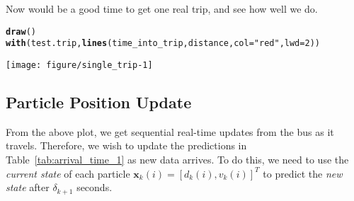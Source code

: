 \documentclass[11pt]{article}\usepackage[]{graphicx}\usepackage[]{color}
\makeatletter
\def\maxwidth{ %
  \ifdim\Gin@nat@width>\linewidth
    \linewidth
  \else
    \Gin@nat@width
  \fi
}
\newcommand{\hlnum}[1]{\textcolor[rgb]{0.686,0.059,0.569}{#1}}%
\newcommand{\hlstr}[1]{\textcolor[rgb]{0.192,0.494,0.8}{#1}}%
\newcommand{\hlstd}[1]{\textcolor[rgb]{0.345,0.345,0.345}{#1}}%
\newcommand{\hlkwc}[1]{\textcolor[rgb]{0.333,0.667,0.333}{#1}}%
\newcommand{\hlkwd}[1]{\textcolor[rgb]{0.737,0.353,0.396}{\textbf{#1}}}%
\newenvironment{kframe}{%
 \def\at@end@of@kframe{}%
 \ifinner\ifhmode%
  \def\at@end@of@kframe{\end{minipage}}%
  \begin{minipage}{\columnwidth}%
 \fi\fi%
 \def\FrameCommand##1{\hskip\@totalleftmargin \hskip-\fboxsep
 \colorbox{shadecolor}{##1}\hskip-\fboxsep
     \hskip-\linewidth \hskip-\@totalleftmargin \hskip\columnwidth}%
 \MakeFramed {\advance\hsize-\width
   \@totalleftmargin\z@ \linewidth\hsize
   \@setminipage}}%
 {\par\unskip\endMakeFramed%
 \at@end@of@kframe}
\newenvironment{knitrout}{}{} %
\newcommand{\bx}{\boldsymbol{x}}
\makeatother
\begin{document}
Now would be a good time to get one real trip, and see how well we do.
\begin{knitrout}
\color{fgcolor}\begin{kframe}
\begin{alltt}
\hlkwd{draw}\hlstd{()}
\hlkwd{with}\hlstd{(test.trip,} \hlkwd{lines}\hlstd{(time_into_trip, distance,} \hlkwc{col} \hlstd{=} \hlstr{"red"}\hlstd{,} \hlkwc{lwd} \hlstd{=} \hlnum{2}\hlstd{))}
\end{alltt}
\end{kframe}
\texttt{[image: figure/single\_trip-1]} 

\end{knitrout}


\subsection{Particle Position Update}
\label{sec:particle_likelihood}

From the above plot, we get sequential real-time updates from the bus as it travels.
Therefore, we wish to update the predictions in Table~\ref{tab:arrival_time_1} as new data arrives.
To do this, we need to use the \emph{current state} of each particle 
$\bx_k(i) = \left[d_k(i), v_k(i)\right]^T$
to predict the \emph{new state} after $\delta_{k+1}$ seconds.
\end{document}
